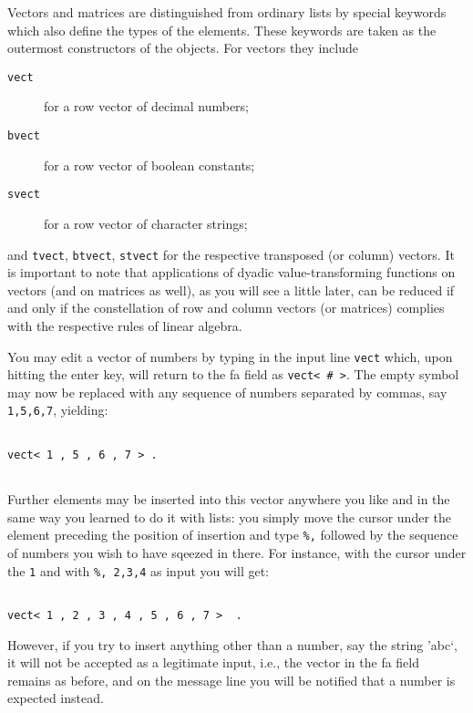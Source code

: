 {\mys Vectors} and {\mys matrices} are distinguished 
from ordinary lists by special {\mys keywords} which also define the types of the elements. These keywords are taken as the outermost
constructors of the objects. For vectors they include
\begin{description}
\item[{\tt vect}] for a row vector of decimal numbers;
\item[{\tt bvect}] for a row vector of boolean constants;
\item[{\tt svect}] for a row vector of character strings;
\end{description}
and {\tt tvect}, {\tt btvect}, {\tt stvect} for the respective
transposed (or column) vectors. It is important to note that
applications of dyadic
value-transforming functions on vectors (and on matrices 
as well), as you will see a little later, can be reduced
if and only if the constellation of row and column vectors (or matrices)
complies with the respective rules of linear algebra. 

You may edit a vector of numbers by typing in the input line
{\tt vect} which, upon hitting the enter key,
 will return to the {\sc fa} field as {\tt vect< \# >}. The empty
symbol may now be replaced with any sequence of numbers
separated by commas, say {\tt 1,5,6,7}, yielding:
\begin{verbatim}

vect< 1 , 5 , 6 , 7 > .
 
\end{verbatim}
Further elements may be inserted into this vector anywhere you
like and in the same way you learned to do it with lists: you
simply move the cursor under the element preceding the position
of insertion and type {\tt \%,} followed by the sequence of
numbers you wish to have sqeezed in there. For instance, with
the cursor under the {\tt 1} and with {\tt \%, 2,3,4} as input
you will get:
\begin{verbatim}

vect< 1 , 2 , 3 , 4 , 5 , 6 , 7 >  .

\end{verbatim}
However, if you try to insert anything other than a number,
say the string 'abc`, it will not be accepted as a legitimate
input, i.e., the vector in the {\sc fa} field remains as before,
and on the message line you will be notified that a number is
expected instead.

